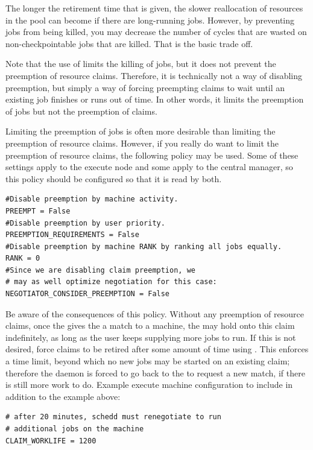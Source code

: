 The longer the retirement time that is given, the slower reallocation
of resources in the pool can become if there are long-running jobs.
However, by preventing jobs from being killed, 
you may decrease the number of
cycles that are wasted on non-checkpointable jobs that are killed.
That is the basic trade off.

Note that the use of  limits the killing
of jobs, but it does not prevent the preemption of resource claims.
Therefore, it is technically not a way of disabling preemption, but
simply a way of forcing preempting claims to wait until an existing
job finishes or runs out of time.  In other words, it limits the preemption
of jobs but not the preemption of claims.

Limiting the preemption of jobs is often more desirable than limiting
the preemption of resource claims.  
However, if you really do want to limit the preemption of resource claims,
the following policy may be used.  Some of these settings apply to the
execute node and some apply to the central manager, so this policy should
be configured so that it is read by both.

\footnotesize
\begin{verbatim}
#Disable preemption by machine activity.
PREEMPT = False
#Disable preemption by user priority.
PREEMPTION_REQUIREMENTS = False
#Disable preemption by machine RANK by ranking all jobs equally.
RANK = 0
#Since we are disabling claim preemption, we
# may as well optimize negotiation for this case:
NEGOTIATOR_CONSIDER_PREEMPTION = False
\end{verbatim}
\normalsize

Be aware of the consequences of this policy. 
Without any preemption of resource claims, once the 
 gives
the  a match to a machine,
the  may hold onto this claim indefinitely,
as long as the user keeps supplying more jobs to run.
If this is not desired, force claims to be retired after
some amount of time using . 
This enforces a time limit, beyond which no new jobs may be started on
an existing claim; therefore the  daemon is forced to go back to
the  to request a new match, if there is still
more work to do.  Example execute machine configuration to include in
addition to the example above:

\footnotesize
\begin{verbatim}
# after 20 minutes, schedd must renegotiate to run
# additional jobs on the machine
CLAIM_WORKLIFE = 1200
\end{verbatim}
\normalsize

